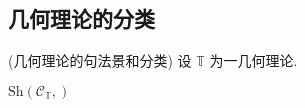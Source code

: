 

%
%
%

\subsection{几何理论的分类\topos{}}

\begin{definition}
    {(几何理论的句法景和分类\topos{})}
    设 $\mathbb T$ 为一几何理论.
    
    $\text{Sh}(\mathcal C_{\mathbb T},)$
\end{definition}

